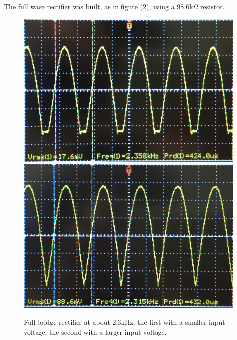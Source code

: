 \documentclass[twocolumn, amsmath]{revtex4}
\begin{document}
The full wave rectifier was built, as in figure (2), using a 98.6k$\Omega$ resistor. %
\begin{figure}[h]
    \includegraphics[scale=0.04]{fullbridge1}  
    \includegraphics[scale=0.039]{fullbridge2} 
    \caption{Full bridge rectifier at about 2.3kHz, the first with a smaller input voltage, the second with a larger input voltage.}
\end{figure}
\end{document}
